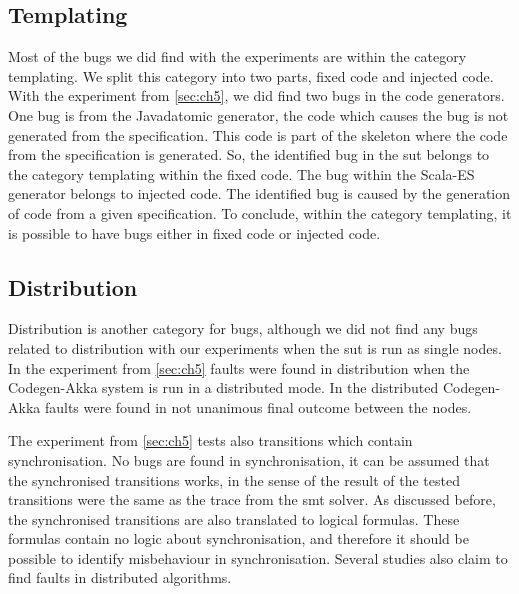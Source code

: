 \subsection{Templating}
Most of the bugs we did find with the experiments are within the category templating. We split this category into two parts, fixed code and injected code. With the experiment from \autoref{sec:ch5}, we did find two bugs in the code generators. One bug is from the Javadatomic generator, the code which causes the bug is not generated from the specification. This code is part of the skeleton where the code from the specification is generated. So, the identified bug in the \gls{sut} belongs to the category templating within the fixed code. The bug within the Scala-ES generator belongs to injected code. The identified bug is caused by the generation of code from a given specification. To conclude, within the category templating, it is possible to have bugs either in fixed code or injected code.

\subsection{Distribution}
Distribution is another category for bugs, although we did not find any bugs
related to distribution with our experiments when the \gls{sut} is run as single
nodes. In the experiment from \autoref{sec:ch5} faults were found in
distribution when the Codegen-Akka system is run in a distributed mode. In the
distributed Codegen-Akka faults were found in not unanimous final outcome
between the nodes.

The experiment from \autoref{sec:ch5} tests also transitions which contain
synchronisation. No bugs are found in synchronisation, it can be assumed that
the synchronised transitions works, in the sense of the result of the tested
transitions were the same as the trace from the \gls{smt} solver. As discussed
before, the synchronised transitions are also translated to logical formulas.
These formulas contain no logic about synchronisation, and therefore it should
be possible to identify misbehaviour in synchronisation. Several studies also
claim to find faults in distributed algorithms.
